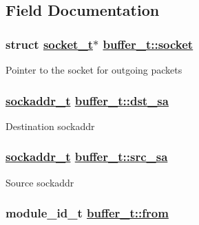 \subsection{Field Documentation}
\hypertarget{structbuffer__t_b3d08149c91ea5c32d3808dfc369708c}{
\subsubsection[socket]{\setlength{\rightskip}{0pt plus 5cm}struct \hyperlink{structsocket__t}{socket\_\-t}$\ast$ \hyperlink{structbuffer__t_b3d08149c91ea5c32d3808dfc369708c}{buffer\_\-t::socket}}}
\label{structbuffer__t_b3d08149c91ea5c32d3808dfc369708c}


Pointer to the socket for outgoing packets \hypertarget{structbuffer__t_77292f1f1beee8363cf331027cd4f76a}{
\subsubsection[dst\_\-sa]{\setlength{\rightskip}{0pt plus 5cm}\hyperlink{structsockaddr__t}{sockaddr\_\-t} \hyperlink{structbuffer__t_77292f1f1beee8363cf331027cd4f76a}{buffer\_\-t::dst\_\-sa}}}
\label{structbuffer__t_77292f1f1beee8363cf331027cd4f76a}


Destination sockaddr \hypertarget{structbuffer__t_a93121920765652ba07cf01351cea7c2}{
\subsubsection[src\_\-sa]{\setlength{\rightskip}{0pt plus 5cm}\hyperlink{structsockaddr__t}{sockaddr\_\-t} \hyperlink{structbuffer__t_a93121920765652ba07cf01351cea7c2}{buffer\_\-t::src\_\-sa}}}
\label{structbuffer__t_a93121920765652ba07cf01351cea7c2}


Source sockaddr \hypertarget{structbuffer__t_57786381935d453fb5f30d6c7a0fd149}{
\subsubsection[from]{\setlength{\rightskip}{0pt plus 5cm}module\_\-id\_\-t \hyperlink{structbuffer__t_57786381935d453fb5f30d6c7a0fd149}{buffer\_\-t::from}}}
\label{structbuffer__t_57786381935d453fb5f30d6c7a0fd149}


